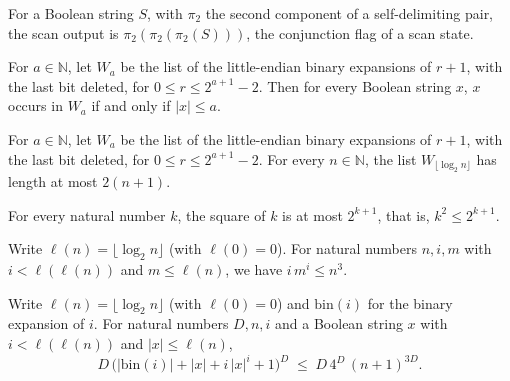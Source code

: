 \begin{definition}
\label{Complexity.ladner_testOut}
\leanok
{}
For a Boolean string $S$, with $\pi_2$ the second component of a self-delimiting pair, the
scan output is $\pi_2(\pi_2(\pi_2(S)))$, the conjunction flag of a scan state.
\end{definition}

\begin{theorem}
\label{Complexity.ladner_shortWords_complete}
\leanok
{}
For $a\in\mathbb N$, let $W_a$ be the list of the little-endian binary expansions of
$r+1$, with the last bit deleted, for $0\le r\le 2^{a+1}-2$. Then for every Boolean string
$x$, $x$ occurs in $W_a$ if and only if $|x|\le a$.
\end{theorem}

\begin{theorem}
\label{Complexity.ladner_shortWords_count}
\leanok
{}
For $a\in\mathbb N$, let $W_a$ be the list of the little-endian binary expansions of $r+1$,
with the last bit deleted, for $0\le r\le 2^{a+1}-2$. For every $n\in\mathbb N$, the list
$W_{\lfloor\log_2 n\rfloor}$ has length at most $2(n+1)$.
\end{theorem}

\begin{theorem}
\label{Complexity.ladner_square_le_power}
\leanok
{}
For every natural number $k$, the square of $k$ is at most $2^{k+1}$, that is,
$k^2\le 2^{k+1}$.
\end{theorem}

\begin{theorem}
\label{Complexity.ladner_short_deadline}
\leanok
{}
Write $\ell(n)=\lfloor\log_2 n\rfloor$ (with $\ell(0)=0$). For natural numbers $n,i,m$ with
$i<\ell(\ell(n))$ and $m\le\ell(n)$, we have $i\,m^i\le n^3$.
\end{theorem}

\begin{theorem}
\label{Complexity.ladner_numeric_envelope}
\leanok
{}
Write $\ell(n)=\lfloor\log_2 n\rfloor$ (with $\ell(0)=0$) and $\mathrm{bin}(i)$ for the
binary expansion of $i$. For natural numbers $D,n,i$ and a Boolean string $x$ with
$i<\ell(\ell(n))$ and $|x|\le\ell(n)$,
\[
  D\,\bigl(|\mathrm{bin}(i)|+|x|+i\,|x|^i+1\bigr)^D\;\le\;D\,4^D\,(n+1)^{3D}.
\]
\end{theorem}

